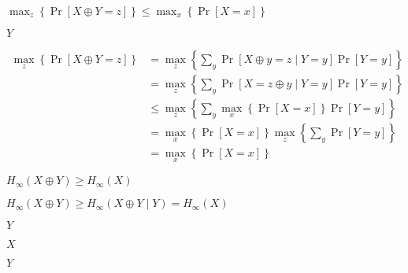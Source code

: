 \documentclass[10pt]{book}
\begin{document}
\begin{mdSnippets}
\begin{mdInlineSnippet}%
$\max_z \left\{ \Pr[X \oplus Y = z]\right\} \leq  \max_x \left\{ \Pr[X = x] \right\}$\end{mdInlineSnippet}%
\begin{mdInlineSnippet}[57cec4137b614c87cb4e24a3d003a3e0]%
$Y$\end{mdInlineSnippet}%
\begin{mdDisplaySnippet}[d38a62babce4e64197fa771f0b835fb8]%
\[%
\begin{aligned}
\max_z \left\{ \Pr[X \oplus Y = z]\right\} &= \max_z \left\{ \sum_y \Pr[X \oplus y = z \mid Y=y]\Pr[Y = y]\right\} \\
&= \max_z \left\{ \sum_y \Pr[X = z \oplus y \mid Y=y]\Pr[Y = y]\right\} \\
&\leq \max_z \left\{ \sum_y  \max_x \left\{ \Pr[X = x] \right\} \Pr[Y = y]\right\} \\
&= \max_x \left\{ \Pr[X = x] \right\} \max_z \left\{ \sum_y \Pr[Y = y]\right\} \\
&= \max_x \left\{ \Pr[X = x] \right\}
\end{aligned} 
\]%
\end{mdDisplaySnippet}%
\begin{mdInlineSnippet}%
$H_{\infty}(X \oplus Y) \geq H_{\infty}(X)$\end{mdInlineSnippet}%
\begin{mdInlineSnippet}[ee44d83c65649b6b29eb500880568b3e]%
$H_{\infty}(X \oplus Y) \geq H_{\infty}(X \oplus Y \mid Y) = H_{\infty}(X)$\end{mdInlineSnippet}%
\begin{mdInlineSnippet}[57cec4137b614c87cb4e24a3d003a3e0]%
$Y$\end{mdInlineSnippet}%
\begin{mdInlineSnippet}[02129bb861061d1a052c592e2dc6b383]%
$X$\end{mdInlineSnippet}%
\begin{mdInlineSnippet}[57cec4137b614c87cb4e24a3d003a3e0]%
$Y$\end{mdInlineSnippet}%
\begin{mdDisplaySnippet}[e9737aced98832e6c26a57e3433c0120]%
\[%
\begin{aligned}

\end{aligned}\]
\end{mdDisplaySnippet}
\end{mdSnippets}
\end{document}
